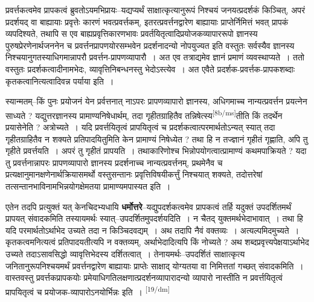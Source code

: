 \documentclass[article,12pt,a4paper]{memoir}
\begin{document}
	  \pstart प्रवर्त्तकत्वमेव प्रापकत्वं ब्रुवतोऽयमभिप्रायः--यद्यप्यर्थं साक्षात्कृत्यानुरूपं निश्चयं जनयत्प्रदर्शकं किञ्चित्, अपरं प्रदर्शयद् वा बाह्यायाः प्रवृत्तेः कारणं भवत्प्रवर्त्तकम्, इतरत्प्रवर्त्तनद्वारेण बाह्यायाः प्राप्तेर्निमित्तं भवत् प्रापकं व्यपदिश्यते, तथापि स एव बाह्यप्रवृत्तिकारणभावः प्रवर्तयितृत्वादिप्रयोजकव्यापाररूपो ज्ञानस्य पुरुषप्रेरणेनार्थजननेन च प्रवर्त्तनप्रापणयोरसम्भवेन प्रदर्शनादन्यो नोपयुज्यत इति वस्तुतः सर्वस्यैव ज्ञानस्य निश्चयानुगतस्याधिगमान्नापरौ प्रवर्त्तन-प्रापणव्यापारौ । अत एव तत्राद्यमेव ज्ञानं प्रमाणं व्यवस्थाप्यते । ततो वस्तुतः प्रदर्शकत्वादीनामभेदः, व्यावृत्तिनिबन्धनस्तु भेदोऽस्त्येव । अत एवैते प्रदर्शक-प्रवर्त्तक-प्रापकशब्दाः कृतकत्वानित्यत्वादिवन्न पर्याया इति ।
	\pend
      

	  \pstart स्यान्मतम्--किं पुनः प्रयोजनं येन प्रर्वत्तनात् नाऽपरः प्रापणव्यापारो ज्ञानस्य, अधिगमाच्च नान्यत्प्रवर्त्तन प्रयत्नेन साध्यते ? यद्युत्तरज्ञानस्य प्रामाण्यनिषेधार्थम्, तदा गृहीतग्राहितैव तन्निषेत्स्य\leavevmode\textsuperscript{\rmlatinfont\tiny [8b/ms]}तीति किं तदर्थेन प्रयासेनेति ? अत्रोच्यते । यदि प्रवर्त्तयितृत्वं प्रापयितृत्वं च प्रदर्शकत्वात्परमार्थतोऽन्यत् स्यात् तदा गृहीतग्राहितैव न शक्यते प्रतिपादयितुमिति केन प्रामाण्यं निषेध्येत ? तथा हि न तज्ज्ञानं गृहीतं गृह्णाति, अपि तु गृहीते प्रवर्त्तयति । अपरं तु गृहीतं प्रापयति । तथाकारिणोश्च भिन्नोपयोगत्वात्प्रामाण्यं कथमपाक्रियते ? यदा तु प्रवर्त्तनान्नापरः प्रापणव्यापारो ज्ञानस्य प्रदर्शनाच्च नान्यत्प्रवर्त्तनम्, प्रथमेनैव च प्रत्यक्षानुमानक्षणेनार्थक्रियासमर्थो वस्तुसन्तानः प्रवृत्तिविषयीकर्त्तुं निश्चयात् शक्यते, तदोत्तरेषां तत्सन्तानभाविनामभिन्नयोगक्षेमतया प्रामाण्यमपास्यत इति ।
	\pend
      

	  \pstart एतेन तदपि प्रत्युक्तं यत् केनचिदभ्यधायि \textbf{धर्मोत्तरे}--यद्युपदर्शकत्वमेव प्रापकत्वं तर्हि यदुक्तं उपदर्शितमर्थं प्रापयत् संवादकमिति तस्यायमर्थः स्यात्--उपदर्शितमुपदर्शयदिति । न चैतद् युक्तमर्थभेदाभावात् । तथा हि यदि परमार्थतोऽर्थाभेद उच्यते तदा न किञ्चिदवद्यम् । अथ तदापि नैवं वक्तव्यः । अत्यल्पमिदमुच्यते । कृतकत्वमनित्यत्वं प्रतिपादयतीत्यपि न वक्तव्यम्, अर्थाभेदादित्यपि किं नोच्यते ? अथ शब्दप्रवृत्त्यपेक्षयाऽर्थाभेद उच्यते तदाऽसावसिद्धो व्यावृत्तिभेदस्य दर्शितत्वात् । तेनायमर्थः--उपदर्शितं साक्षात्कृत्य जनितानुरूपनिश्चयमर्थं प्रवर्त्तनद्वारेण बाह्यायाः प्राप्तेः साक्षाद् योग्यतया वा निमित्ततां गच्छत् संवादकमिति । वास्तवस्तु प्रवर्त्तकप्रापकयोः प्रमेयाधिगतिलक्षणात्प्रदर्शनव्यापारादन्यो व्यापारो नास्तीति न प्रवर्त्तयितृत्वं प्रापयितृत्वं च प्रयोजक-व्यापारोऽनयोर्भिन्नः इति ।
	\pend
      \leavevmode\textsuperscript{\rmlatinfont\tiny [19/dm]}
\end{document}
